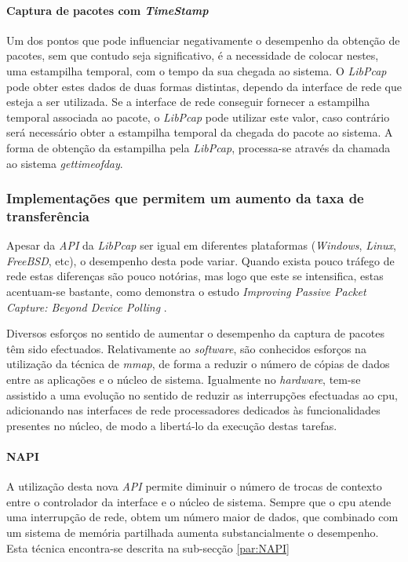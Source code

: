 \paragraph{Captura de pacotes com \textit{TimeStamp}}
Um dos pontos que pode influenciar negativamente o desempenho da obtenção de pacotes, sem que contudo seja significativo, é a necessidade de colocar nestes, uma estampilha temporal, com o tempo da sua chegada ao sistema.
O \textit{LibPcap} pode obter estes dados de duas formas distintas, dependo da interface de rede que esteja a ser utilizada.
Se a interface de rede conseguir fornecer a estampilha temporal associada ao pacote, o \textit{LibPcap} pode utilizar este valor, caso contrário será necessário obter a estampilha temporal da chegada do pacote ao sistema.
A forma de obtenção da estampilha pela \textit{LibPcap}, processa-se através da chamada ao sistema \textit{gettimeofday}.

\subsubsection{Implementações que permitem um aumento da taxa de transferência}

Apesar da \textit{API} da \textit{LibPcap} ser igual em diferentes plataformas (\textit{Windows}, \textit{Linux}, \textit{FreeBSD}, etc), o desempenho desta pode variar.
Quando exista pouco tráfego de rede estas diferenças são pouco notórias, mas logo que este se intensifica, estas acentuam-se bastante, como demonstra o estudo \textit{Improving Passive Packet Capture: Beyond Device Polling} \cite{Deri2004}.

Diversos esforços no sentido de aumentar o desempenho da captura de pacotes têm sido efectuados.
Relativamente ao \textit{software}, são conhecidos esforços na utilização da técnica de \textit{mmap}, de forma a reduzir o número de cópias de dados entre as aplicações e o núcleo de sistema.
Igualmente no \textit{hardware}, tem-se assistido a uma evolução no sentido de reduzir as interrupções efectuadas ao cpu, adicionando nas interfaces de rede processadores dedicados às funcionalidades presentes no núcleo, de modo a libertá-lo da execução destas tarefas.

\paragraph*{NAPI}

A utilização desta nova \textit{API} permite diminuir o número de trocas de contexto entre o controlador da interface e o núcleo de sistema.
Sempre que o cpu atende uma interrupção de rede, obtem um número maior de dados, que combinado com um sistema de memória partilhada aumenta substancialmente o desempenho.
Esta técnica encontra-se descrita na sub-secção \ref{par:NAPI}

